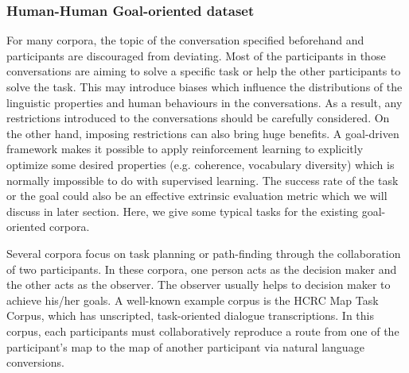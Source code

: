 \documentclass[bsc,frontabs,twoside,singlespacing,parskip,deptreport]{infthesis}     %
\begin{document}




\subsubsection*{Human-Human Goal-oriented dataset}

For many corpora, the topic of the conversation specified beforehand and participants are discouraged from deviating. Most of the participants in those conversations are aiming to solve a specific task or help the other participants to solve the task. This may introduce biases which influence the distributions of the linguistic properties and human behaviours in the conversations. As a result, any restrictions introduced to the conversations should be carefully considered. On the other hand, imposing restrictions can also bring huge benefits. A goal-driven framework makes it possible to apply reinforcement learning to explicitly optimize some desired properties (e.g. coherence, vocabulary diversity) which is normally impossible to do with supervised learning\cite{jurafsky2019speech}. The success rate of the task or the goal could also be an effective extrinsic evaluation metric which we will discuss in later section. Here, we give some typical tasks for the existing goal-oriented corpora.

Several corpora focus on task planning or path-finding through the collaboration of two participants. In these corpora, one person acts as the decision maker and the other acts as the observer. The observer usually helps to decision maker to achieve his/her goals. A well-known example corpus is the HCRC Map Task Corpus\cite{anderson1991hcrc}, which has unscripted, task-oriented dialogue transcriptions. In this corpus, each participants must collaboratively reproduce a route from one of the participant’s map to the map of another participant via natural language conversions. 
\end{document}
